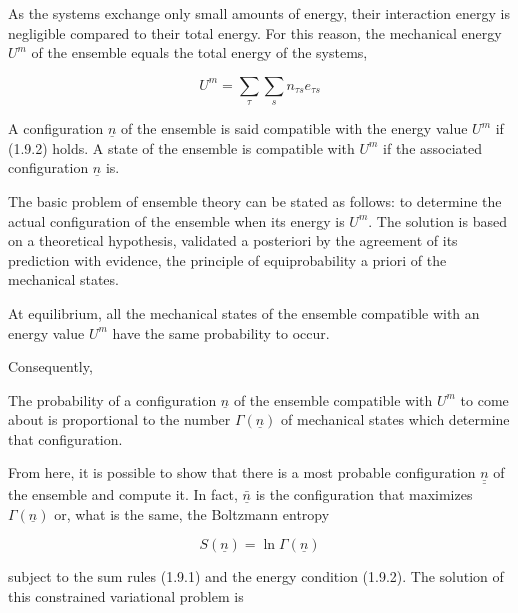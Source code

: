 \documentclass{article}
\begin{document}
As the systems exchange only small amounts of energy, their interaction energy is negligible compared to their total energy. For this reason, the mechanical energy $U^{m}$ of the ensemble equals the total energy of the systems,

\begin{equation}
U^{m}=\sum_{\tau} \sum_{s} n_{\tau s} e_{\tau s} \tag{1.9.2}
\end{equation}

A configuration $\underline{n}$ of the ensemble is said compatible with the energy value $U^{m}$ if (1.9.2) holds. A state of the ensemble is compatible with $U^{m}$ if the associated configuration $\underline{n}$ is.

The basic problem of ensemble theory can be stated as follows: to determine the actual configuration of the ensemble when its energy is $U^{m}$. The solution is based on a theoretical hypothesis, validated a posteriori by the agreement of its prediction with evidence, the principle of equiprobability a priori of the mechanical states.



At equilibrium, all the mechanical states of the ensemble compatible with an energy value $U^{m}$ have the same probability to occur.

Consequently,

The probability of a configuration $\underline{n}$ of the ensemble compatible with $U^{m}$ to come about is proportional to the number $\Gamma(\underline{n})$ of mechanical states which determine that configuration.

From here, it is possible to show that there is a most probable configuration $\underline{\underline{n}}$ of the ensemble and compute it. In fact, $\underline{\bar{n}}$ is the configuration that maximizes $\Gamma(\underline{n})$ or, what is the same, the Boltzmann entropy

\begin{equation}
S(\underline{n})=\ln \Gamma(\underline{n}) \tag{1.9.3}
\end{equation}

subject to the sum rules (1.9.1) and the energy condition (1.9.2). The solution of this constrained variational problem is
\end{document}
